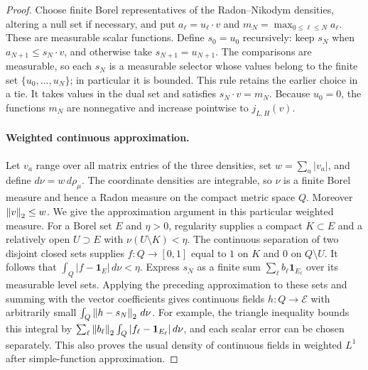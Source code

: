 \begin{proof}
Choose finite Borel representatives of the Radon--Nikodym densities,
altering a null set if necessary, and put
$a_\ell=u_\ell\cdot v$ and $m_N=\max_{0\le\ell\le N}a_\ell$. These are
measurable scalar functions. Define $s_0=u_0$ recursively: keep $s_N$
when $a_{N+1}\le s_N\cdot v$, and otherwise take $s_{N+1}=u_{N+1}$.
The comparisons are measurable, so each $s_N$ is a measurable selector
whose values belong to the finite set $\{u_0,\ldots,u_N\}$; in particular
it is bounded. This rule retains the earlier choice in a tie.
It takes values in the dual set and satisfies $s_N\cdot v=m_N$.
Because $u_0=0$, the functions $m_N$ are nonnegative and increase
pointwise to $j_{L,H}(v)$.

\paragraph{Weighted continuous approximation.}
Let $v_a$ range over all matrix entries of the three densities, set
$w=\sum_a|v_a|$, and define $d\nu=w\,d\rho_\mu$. The coordinate densities
are integrable, so $\nu$ is a finite Borel measure and hence a Radon
measure on the compact metric space $Q$. Moreover $\left\lVert v\right\rVert_2\le w$.
We give the approximation argument in this particular weighted measure.
For a Borel set $E$ and $\eta>0$, regularity supplies a compact $K\subset E$
and a relatively open $U\supset E$ with $\nu(U\setminus K)<\eta$.
The continuous separation of two disjoint closed sets supplies
$f:Q\to[0,1]$ equal to $1$ on $K$ and $0$ on $Q\setminus U$.
It follows that $\int_Q|f-\mathbf1_E|\,d\nu<\eta$.
Express $s_N$ as a finite sum $\sum_\ell b_\ell\mathbf1_{E_\ell}$ over
its measurable level sets. Applying the preceding approximation to these
sets and summing with the vector coefficients gives continuous fields $h:Q\to\mathcal E$
with arbitrarily small $\int_Q\left\lVert h-s_N\right\rVert_2\,d\nu$.
For example, the triangle inequality bounds this integral by
$\sum_\ell\left\lVert b_\ell\right\rVert_2
\int_Q|f_\ell-\mathbf1_{E_\ell}|\,d\nu$, and each scalar error can
be chosen separately. This also proves the usual density of continuous
fields in weighted $L^1$ after simple-function approximation.


\end{proof}

